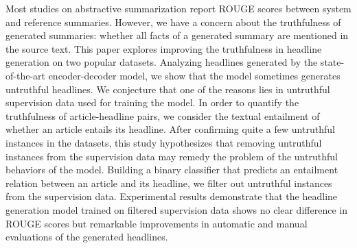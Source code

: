 Most studies on abstractive summarization report ROUGE scores between system and reference summaries. However, we have a concern about the truthfulness of generated summaries: whether all facts of a generated summary are mentioned in the source text. This paper explores improving the truthfulness in headline generation on two popular datasets. Analyzing headlines generated by the state-of-the-art encoder-decoder model, we show that the model sometimes generates untruthful headlines. We conjecture that one of the reasons lies in untruthful supervision data used for training the model. In order to quantify the truthfulness of article-headline pairs, we consider the textual entailment of whether an article entails its headline. After confirming quite a few untruthful instances in the datasets, this study hypothesizes that removing untruthful instances from the supervision data may remedy the problem of the untruthful behaviors of the model. Building a binary classifier that predicts an entailment relation between an article and its headline, we filter out untruthful instances from the supervision data. Experimental results demonstrate that the headline generation model trained on filtered supervision data shows no clear difference in ROUGE scores but remarkable improvements in automatic and manual evaluations of the generated headlines.
